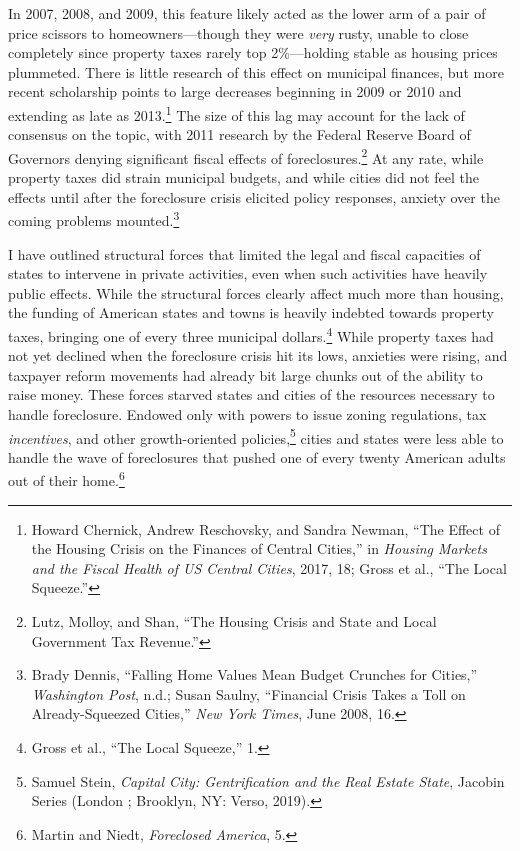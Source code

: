 \documentclass[12pt,oneside]{psthesis}
\begin{document}
In 2007, 2008, and 2009, this feature likely acted as the lower arm of a pair of price scissors to homeowners---though they were \emph{very} rusty, unable to close completely since property taxes rarely top 2\%---holding stable as housing prices plummeted.
There is little research of this effect on municipal finances, but more recent scholarship points to large decreases beginning in 2009 or 2010 and extending as late as 2013.\footnote{Howard Chernick, Andrew Reschovsky, and Sandra Newman, ``The Effect of the Housing Crisis on the Finances of Central Cities,'' in \emph{Housing Markets and the Fiscal Health of US Central Cities}, 2017, 18; Gross et al., ``The Local Squeeze.''}
The size of this lag may account for the lack of consensus on the topic, with 2011 research by the Federal Reserve Board of Governors denying significant fiscal effects of foreclosures.\footnote{Lutz, Molloy, and Shan, ``The Housing Crisis and State and Local Government Tax Revenue.''}
At any rate, while property taxes did strain municipal budgets, and while cities did not feel the effects until after the foreclosure crisis elicited policy responses, anxiety over the coming problems mounted.\footnote{Brady Dennis, ``Falling Home Values Mean Budget Crunches for Cities,'' \emph{Washington Post}, n.d.; Susan Saulny, ``Financial Crisis Takes a Toll on Already-Squeezed Cities,'' \emph{New York Times}, June 2008, 16.}

I have outlined structural forces that limited the legal and fiscal capacities of states to intervene in private activities, even when such activities have heavily public effects.
While the structural forces clearly affect much more than housing, the funding of American states and towns is heavily indebted towards property taxes, bringing one of every three municipal dollars.\footnote{Gross et al., ``The Local Squeeze,'' 1.}
While property taxes had not yet declined when the foreclosure crisis hit its lows, anxieties were rising, and taxpayer reform movements had already bit large chunks out of the ability to raise money.
These forces starved states and cities of the resources necessary to handle foreclosure.
Endowed only with powers to issue zoning regulations, tax \emph{incentives}, and other growth-oriented policies,\footnote{Samuel Stein, \emph{Capital City: Gentrification and the Real Estate State}, Jacobin Series (London ; Brooklyn, NY: Verso, 2019).} cities and states were less able to handle the wave of foreclosures that pushed one of every twenty American adults out of their home.\footnote{Martin and Niedt, \emph{Foreclosed America}, 5.}
\end{document}
